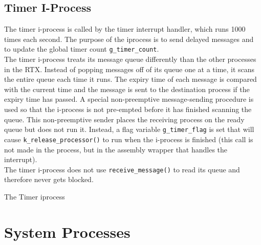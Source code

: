 \documentclass[12pt]{report}
\begin{document}
\subsection{Timer I-Process}

The timer i-process is called by the timer interrupt handler, which runs 1000 times each second. The purpose of the iprocess is to send delayed messages and to update the global timer count {\tt g\_timer\_count}.\\

The timer i-process treats its message queue differently than the other processes in the RTX. Instead of popping messages off of its queue one at a time, it scans the entire queue each time it runs. The expiry time of each message is compared with the current time and the message is sent to the destination process if the expiry time has passed. A special non-preemptive message-sending procedure is used so that the i-process is not pre-empted before it has finished scanning the queue. This non-preemptive sender places the receiving process on the ready queue but does not run it. Instead, a flag variable {\tt g\_timer\_flag} is set that will cause {\tt k\_release\_processor()} to run when the i-process is finished (this call is not made in the process, but in the assembly wrapper that handles the interrupt).\\

The timer i-process does not use {\tt receive\_message()} to read its queue and therefore never gets blocked.\\

\begin{algorithm}
  \caption{The Timer iprocess}
  \begin{algorithmic}[1]
			\EndIf
		\EndFor
    \EndProcedure
  \end{algorithmic}
\end{algorithm}



\section{System Processes}
\end{document}
